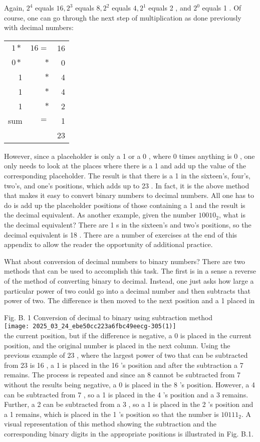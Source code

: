 \documentclass[10pt]{article}
\begin{document}
Again, $2^{4}$ equals $16,2^{3}$ equals $8,2^{2}$ equals $4,2^{1}$ equals 2 , and $2^{0}$ equals 1 . Of course, one can go through the next step of multiplication as done previously with decimal numbers:

\begin{center}
\begin{tabular}{rrr}
$1 *$ & $16=$ & 16 \\
$0 *$ & $*$ & 0 \\
1 & $*$ & 4 \\
1 & $*$ & 4 \\
1 & $*$ & 2 \\
\hline
sum & $=$ & 1 \\
\hline
 &  & 23 \\
\hline
\end{tabular}
\end{center}

However, since a placeholder is only a 1 or a 0 , where 0 times anything is 0 , one only needs to look at the places where there is a 1 and add up the value of the corresponding placeholder. The result is that there is a 1 in the sixteen's, four's, two's, and one's positions, which adds up to 23 . In fact, it is the above method that makes it easy to convert binary numbers to decimal numbers. All one has to do is add up the placeholder positions of those containing a 1 and the result is the decimal equivalent. As another example, given the number $10010_{2}$, what is the decimal equivalent? There are 1 s in the sixteen's and two's positions, so the decimal equivalent is 18 . There are a number of exercises at the end of this appendix to allow the reader the opportunity of additional practice.

What about conversion of decimal numbers to binary numbers? There are two methods that can be used to accomplish this task. The first is in a sense a reverse of the method of converting binary to decimal. Instead, one just asks how large a particular power of two could go into a decimal number and then subtracts that power of two. The difference is then moved to the next position and a 1 placed in

Fig. B. 1 Conversion of decimal to binary using subtraction method\\
\texttt{[image: 2025\_03\_24\_ebe50cc223a6fbc49eecg-305(1)]}\\
the current position, but if the difference is negative, a 0 is placed in the current position, and the original number is placed in the next column. Using the previous example of 23 , where the largest power of two that can be subtracted from 23 is 16 , a 1 is placed in the 16 's position and after the subtraction a 7 remains. The process is repeated and since an 8 cannot be subtracted from 7 without the results being negative, a 0 is placed in the 8 's position. However, a 4 can be subtracted from 7 , so a 1 is placed in the 4 's position and a 3 remains. Further, a 2 can be subtracted from a 3 , so a 1 is placed in the 2 's position and a 1 remains, which is placed in the 1 's position so that the number is $10111_{2}$. A visual representation of this method showing the subtraction and the corresponding binary digits in the appropriate positions is illustrated in Fig. B.1.
\end{document}
